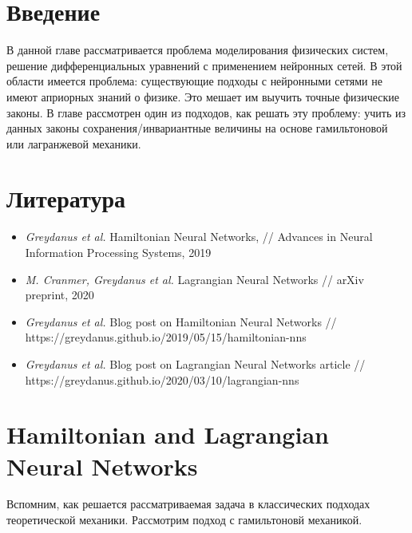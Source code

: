 \section{Введение}

В данной главе рассматривается проблема моделирования физических систем, решение дифференциальных уравнений с применением нейронных сетей. В этой области имеется проблема: существующие подходы с нейронными сетями не имеют априорных знаний о физике. Это мешает им выучить точные физические законы. В главе рассмотрен один из подходов, как решать эту проблему: учить из данных законы сохранения/инвариантные величины на основе гамильтоновой или лагранжевой механики.

\section{Литература}

\begin{itemize}
	\item \textit{Greydanus et al.} Hamiltonian Neural Networks, // Advances in Neural Information Processing Systems, 2019
	\item \textit{M. Cranmer, Greydanus et al.} Lagrangian Neural Networks // arXiv preprint, 2020
	\item \textit{Greydanus et al.}  Blog post on Hamiltonian Neural Networks // \\https://greydanus.github.io/2019/05/15/hamiltonian-nns
	\item \textit{Greydanus et al.}  Blog post on Lagrangian Neural Networks article // \\https://greydanus.github.io/2020/03/10/lagrangian-nns
\end{itemize}


\section{Hamiltonian and Lagrangian Neural Networks}

Вспомним, как решается рассматриваемая задача в классических подходах теоретической механики. Рассмотрим подход с гамильтоновй механикой.

